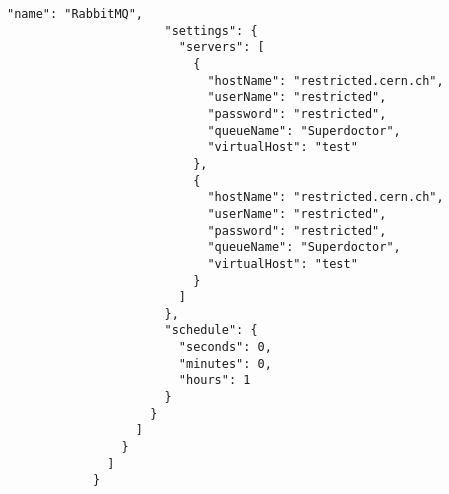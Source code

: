 \begin{lstlisting}[style=csharp, caption=Fichero de configuración]
                      "name": "RabbitMQ",
                      "settings": {
                        "servers": [
                          {
                            "hostName": "restricted.cern.ch",
                            "userName": "restricted",
                            "password": "restricted",
                            "queueName": "Superdoctor",
                            "virtualHost": "test"
                          },
                          {
                            "hostName": "restricted.cern.ch",
                            "userName": "restricted",
                            "password": "restricted",
                            "queueName": "Superdoctor",
                            "virtualHost": "test"
                          }
                        ]
                      },
                      "schedule": {
                        "seconds": 0,
                        "minutes": 0,
                        "hours": 1
                      }
                    }
                  ]
                }
              ]
            }
        \end{lstlisting}
